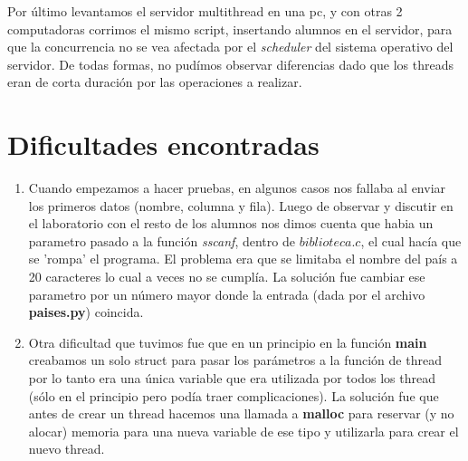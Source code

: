 \documentclass[a4paper, 10pt]{article}
\begin{document}
Por \'ultimo levantamos el servidor multithread en una pc, y con otras 2 computadoras corrimos el mismo script, insertando alumnos en el servidor, para que la concurrencia no se vea afectada por el \textit{scheduler} del sistema operativo del servidor. De todas formas, no pud\'imos observar diferencias dado que los threads eran de corta duraci\'on por las operaciones a realizar. \\


\section{Dificultades encontradas}
\begin{enumerate}
\item Cuando empezamos a hacer pruebas, en algunos casos nos fallaba al enviar los primeros datos (nombre, columna y fila). Luego de observar y discutir en el laboratorio con el resto de los alumnos nos dimos cuenta que habia un parametro pasado a la funci\'on \textit{sscanf}, dentro de $biblioteca.c$, el cual hac\'ia que se 'rompa' el programa. El problema era que se limitaba el nombre del pa\'is a 20 caracteres lo cual a veces no se cumpl\'ia. La soluci\'on fue cambiar ese parametro por un n\'umero mayor donde la entrada (dada por el archivo \textbf{paises.py}) coincida.

\item Otra dificultad que tuvimos fue que en un principio en la funci\'on \textbf{main} creabamos un solo struct para pasar los par\'ametros a la funci\'on de thread por lo tanto era una \'unica variable que era utilizada por todos los thread (s\'olo en el principio pero pod\'ia traer complicaciones). La soluci\'on fue que antes de crear un thread hacemos una llamada a \textbf{malloc} para reservar (y no alocar) memoria para una nueva variable de ese tipo y utilizarla para crear el nuevo thread.
\end{enumerate}
\end{document}
